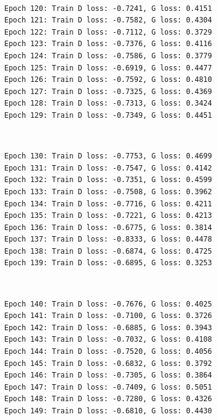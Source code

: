 \documentclass[11pt]{article}
\begin{document}
    \begin{center}
    \end{center}
    { \hspace*{\fill} \\}
    
    \begin{Verbatim}[commandchars=\\\{\}]
Epoch 120: Train D loss: -0.7241, G loss: 0.4151
Epoch 121: Train D loss: -0.7582, G loss: 0.4304
Epoch 122: Train D loss: -0.7112, G loss: 0.3729
Epoch 123: Train D loss: -0.7376, G loss: 0.4116
Epoch 124: Train D loss: -0.7586, G loss: 0.3779
Epoch 125: Train D loss: -0.6919, G loss: 0.4477
Epoch 126: Train D loss: -0.7592, G loss: 0.4810
Epoch 127: Train D loss: -0.7325, G loss: 0.4369
Epoch 128: Train D loss: -0.7313, G loss: 0.3424
Epoch 129: Train D loss: -0.7349, G loss: 0.4451

    \end{Verbatim}

    \begin{center}
    \end{center}
    { \hspace*{\fill} \\}
    
    \begin{Verbatim}[commandchars=\\\{\}]
Epoch 130: Train D loss: -0.7753, G loss: 0.4699
Epoch 131: Train D loss: -0.7547, G loss: 0.4142
Epoch 132: Train D loss: -0.7351, G loss: 0.4599
Epoch 133: Train D loss: -0.7508, G loss: 0.3962
Epoch 134: Train D loss: -0.7716, G loss: 0.4211
Epoch 135: Train D loss: -0.7221, G loss: 0.4213
Epoch 136: Train D loss: -0.6775, G loss: 0.3814
Epoch 137: Train D loss: -0.8333, G loss: 0.4478
Epoch 138: Train D loss: -0.6874, G loss: 0.4725
Epoch 139: Train D loss: -0.6895, G loss: 0.3253

    \end{Verbatim}

    \begin{center}
    \end{center}
    { \hspace*{\fill} \\}
    
    \begin{Verbatim}[commandchars=\\\{\}]
Epoch 140: Train D loss: -0.7676, G loss: 0.4025
Epoch 141: Train D loss: -0.7100, G loss: 0.3726
Epoch 142: Train D loss: -0.6885, G loss: 0.3943
Epoch 143: Train D loss: -0.7032, G loss: 0.4108
Epoch 144: Train D loss: -0.7520, G loss: 0.4056
Epoch 145: Train D loss: -0.6832, G loss: 0.3792
Epoch 146: Train D loss: -0.7305, G loss: 0.3864
Epoch 147: Train D loss: -0.7409, G loss: 0.5051
Epoch 148: Train D loss: -0.7280, G loss: 0.4326
Epoch 149: Train D loss: -0.6810, G loss: 0.4430

    \end{Verbatim}
\end{document}
